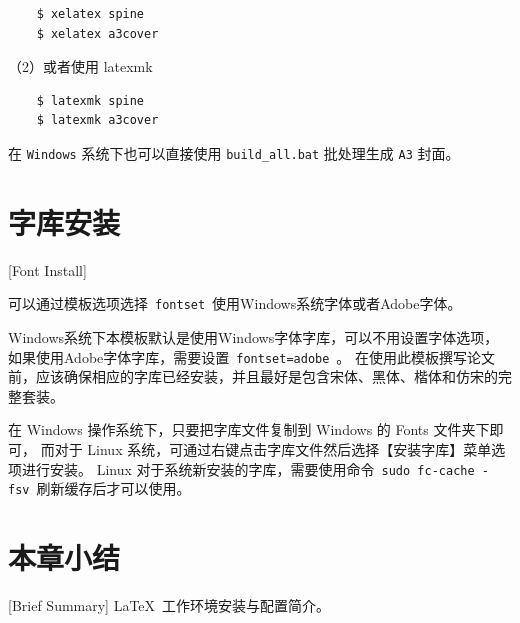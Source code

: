 \begin{lstlisting}
    $ xelatex spine
    $ xelatex a3cover
\end{lstlisting}

（2）或者使用 latexmk

\begin{lstlisting}
    $ latexmk spine
    $ latexmk a3cover
\end{lstlisting}

在 \texttt{Windows} 系统下也可以直接使用 \texttt{build\_all.bat} 批处理生成 \texttt{A3} 封面。

\section{字库安装}[Font Install]

可以通过模板选项选择~\texttt{fontset}~使用Windows系统字体或者Adobe字体。

Windows系统下本模板默认是使用Windows字体字库，可以不用设置字体选项，如果使用Adobe字体字库，需要设置~\texttt{fontset=adobe}~。
在使用此模板撰写论文前，应该确保相应的字库已经安装，并且最好是包含宋体、黑体、楷体和仿宋的完整套装。

在 Windows 操作系统下，只要把字库文件复制到 Windows 的 Fonts 文件夹下即可，
而对于 Linux 系统，可通过右键点击字库文件然后选择【安装字库】菜单选项进行安装。
Linux 对于系统新安装的字库，需要使用命令~\texttt{sudo fc-cache -fsv}~刷新缓存后才可以使用。

\section{本章小结}[Brief Summary]
\LaTeX{}~工作环境安装与配置简介。
